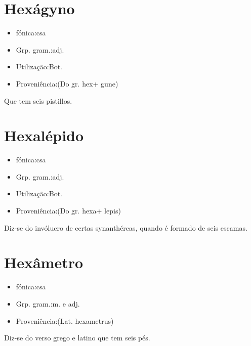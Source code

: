 \documentclass{article}
\begin{document}
\section{Hexágyno}
\begin{itemize}
\item {fónica:csa}
\end{itemize}
\begin{itemize}
\item {Grp. gram.:adj.}
\end{itemize}
\begin{itemize}
\item {Utilização:Bot.}
\end{itemize}
\begin{itemize}
\item {Proveniência:(Do gr. \textunderscore hex\textunderscore  + \textunderscore gune\textunderscore )}
\end{itemize}
Que tem seis pistillos.
\section{Hexalépido}
\begin{itemize}
\item {fónica:csa}
\end{itemize}
\begin{itemize}
\item {Grp. gram.:adj.}
\end{itemize}
\begin{itemize}
\item {Utilização:Bot.}
\end{itemize}
\begin{itemize}
\item {Proveniência:(Do gr. \textunderscore hexa\textunderscore  + \textunderscore lepis\textunderscore )}
\end{itemize}
Diz-se do invólucro de certas synanthéreas, quando é formado de seis escamas.
\section{Hexâmetro}
\begin{itemize}
\item {fónica:csa}
\end{itemize}
\begin{itemize}
\item {Grp. gram.:m.  e  adj.}
\end{itemize}
\begin{itemize}
\item {Proveniência:(Lat. \textunderscore hexametrus\textunderscore )}
\end{itemize}
Diz-se do verso grego e latino que tem seis pés.
\end{document}
